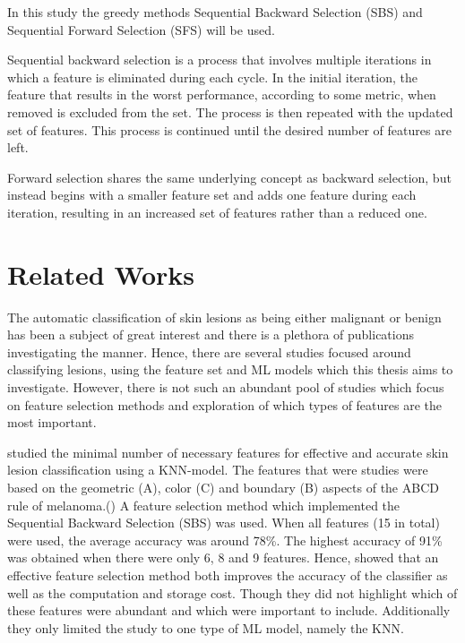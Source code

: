 \documentclass{kththesis}
\begin{document}
In this study the greedy methods Sequential Backward Selection (SBS) and Sequential Forward Selection (SFS) will be used.

Sequential backward selection is a process that involves multiple iterations in which a feature is eliminated during each cycle. In the initial iteration, the feature that results in the worst performance, according to some metric, when removed is excluded from the set. The process is then repeated with the updated set of features. This process is continued until the desired number of features are left. \parencite{chaganti2022thyroid}

Forward selection shares the same underlying concept as backward selection, but instead begins with a smaller feature set and adds one feature during each iteration, resulting in an increased set of features rather than a reduced one.


\section{Related Works}



The automatic classification of skin lesions as being either malignant or benign has been a subject of great interest and there is a plethora of publications investigating the manner. Hence, there are several studies focused around classifying lesions, using the feature set and ML models which this thesis aims to investigate. However, there is not such an abundant pool of studies which focus on feature selection methods and exploration of which types of features are the most important. 

\parencite{MustafaSuleiman2017Fsus} studied the minimal number of necessary features for effective and accurate skin lesion classification using a KNN-model.  The features that were studies were based on the geometric (A), color (C)  and boundary (B) aspects of the ABCD rule of melanoma.(\parencite{MustafaSuleiman2017Fsus}) A feature selection method which implemented the Sequential Backward Selection (SBS) was used. When all features (15 in total) were used, the average accuracy was around 78\%. The highest accuracy of 91\% was obtained when there were only 6, 8 and 9 features. Hence, \parencite{MustafaSuleiman2017Fsus} showed that an effective feature selection method both improves the accuracy of the classifier as well as the computation and storage cost. Though they did not highlight which of these features were abundant and which were important to include. Additionally they only limited the study to one type of ML model, namely the KNN. 
\end{document}
